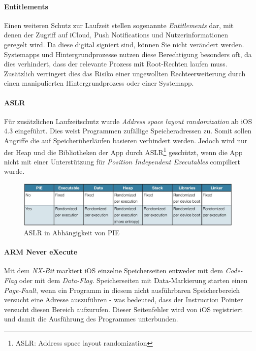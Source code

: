		\paragraph{Entitlements}
			Einen weiteren Schutz zur Laufzeit stellen sogenannte \textsl{Entitlements}
			dar, mit denen der Zugriff auf iCloud, Push	Notifications und
			Nutzerinformationen geregelt wird. Da diese digital signiert sind, können Sie
			nicht verändert werden. Systemapps und Hintergrundprozesse nutzen diese
			Berechtigung besonders oft, da dies verhindert, dass der relevante Prozess
			mit Root-Rechten laufen muss. Zusätzlich verringert dies das Risiko einer
			ungewollten Rechteerweiterung durch einen manipulierten Hintergrundprozess oder einer
			Systemapp.
		
		\paragraph{ASLR}
			Für zusätzlichen Laufzeitschutz wurde \textsl{Address space layout
			randomization}\cite[S.1]{iOS4SecurityEvalutaion} ab iOS 4.3 eingeführt. Dies
			weist Programmen zufällige Speicheradressen zu. Somit sollen Angriffe die auf
			Speicherüberläufen basieren verhindert werden\cite[S.131]{Levin2012}. Jedoch
			wird nur der Heap und die Bibliotheken der App durch
			ASLR\footnote{ASLR: Address space layout randomization}
			geschützt, wenn die App nicht mit einer Unterstützung für \textsl{Position Independent
			Executables} compiliert wurde.
			\begin{figure}[h]
				\centering
				\includegraphics[width=0.9\linewidth]{ios/media/aslr-pie.jpg}
				\caption{ASLR in Abhängigkeit von PIE
				\cite[S.1]{iOS4SecurityEvalutaion}}
				\label{fig:aslr}
			\end{figure}
		
		\paragraph{ARM Never eXecute}
			Mit dem \textsl{NX-Bit} markiert iOS einzelne Speicherseiten entweder mit dem
			\textsl{Code-Flag} oder mit dem \textsl{Data-Flag}. Speicherseiten mit
			Data-Markierung starten einen \textsl{Page-Fault}, wenn ein Programm in
			diesem nicht ausführbaren Speicherbereich versucht eine Adresse auszuführen
			- was bedeuted, dass der Instruction Pointer versucht diesen Bereich
			aufzurufen. Dieser Seitenfehler wird von iOS registriert und damit die
			Ausführung des Programmes unterbunden\cite[S.310]{Levin2012}.